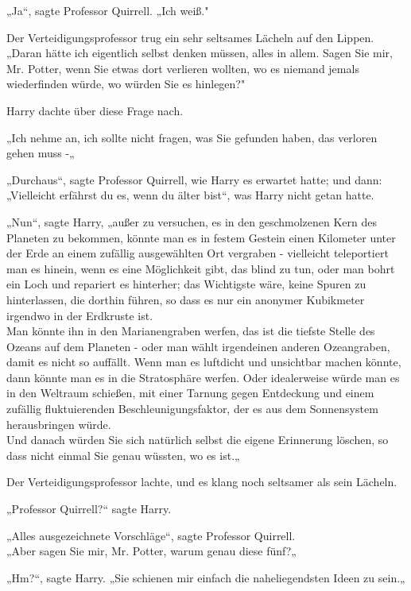 {„Ja“, sagte Professor Quirrell. „Ich weiß."

Der Verteidigungsprofessor trug ein sehr seltsames Lächeln auf den Lippen.\\ „Daran hätte ich eigentlich selbst denken müssen, alles in allem. Sagen Sie mir, Mr. Potter, wenn Sie etwas dort verlieren wollten, wo es niemand jemals wiederfinden würde, wo würden Sie es hinlegen?"

Harry dachte über diese Frage nach.

„Ich nehme an, ich sollte nicht fragen, was Sie gefunden haben, das verloren gehen muss -„

„Durchaus“, sagte Professor Quirrell, wie Harry es erwartet hatte; und dann:\\ „Vielleicht erfährst du es, wenn du älter bist“, was Harry nicht getan hatte.

„Nun“, sagte Harry, „außer zu versuchen, es in den geschmolzenen Kern des Planeten zu bekommen, könnte man es in festem Gestein einen Kilometer unter der Erde an einem zufällig ausgewählten Ort vergraben - vielleicht teleportiert man es hinein, wenn es eine Möglichkeit gibt, das blind zu tun, oder man bohrt ein Loch und repariert es hinterher; das Wichtigste wäre, keine Spuren zu hinterlassen, die dorthin führen, so dass es nur ein anonymer Kubikmeter irgendwo in der Erdkruste ist.\\ Man könnte ihn in den Marianengraben werfen, das ist die tiefste Stelle des Ozeans auf dem Planeten - oder man wählt irgendeinen anderen Ozeangraben, damit es nicht so auffällt. Wenn man es luftdicht und unsichtbar machen könnte, dann könnte man es in die Stratosphäre werfen. Oder idealerweise würde man es in den Weltraum schießen, mit einer Tarnung gegen Entdeckung und einem zufällig fluktuierenden Beschleunigungsfaktor, der es aus dem Sonnensystem herausbringen würde.\\ Und danach würden Sie sich natürlich selbst die eigene Erinnerung löschen, so dass nicht einmal Sie genau wüssten, wo es ist.„

Der Verteidigungsprofessor lachte, und es klang noch seltsamer als sein Lächeln.

„Professor Quirrell?“ sagte Harry.

„Alles ausgezeichnete Vorschläge“, sagte Professor Quirrell.\\ „Aber sagen Sie mir, Mr. Potter, warum genau diese fünf?„

„Hm?“, sagte Harry. „Sie schienen mir einfach die naheliegendsten Ideen zu sein.„

}
